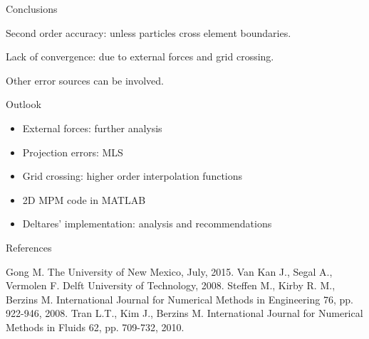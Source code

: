 \documentclass[mathserif,professionalfont,hyperref={pdfpagelabels=false}]{beamer}
\begin{document}
\begin{frame}{Conclusions}
\begin{tcolorbox}[colback=blue!5,colframe=blue!40!black,title=Vibrating bar]
Second order accuracy: unless particles  cross element boundaries.
\end{tcolorbox}
\pause
\begin{tcolorbox}[colback=blue!5,colframe=blue!40!black,title=Oedometer]
Lack of convergence: due to external forces and grid crossing.
\end{tcolorbox}
\pause
\begin{tcolorbox}[colback=blue!5,colframe=blue!40!black,title=Both problems]
Other error sources can be involved.
\end{tcolorbox}
\end{frame}

\begin{frame}{Outlook}
\begin{itemize}
\item External forces: further analysis 
\item Projection errors: MLS
\item Grid crossing: higher order interpolation functions
\item 2D MPM code in MATLAB
\item Deltares' implementation: analysis and recommendations
\end{itemize}
\end{frame}



\begin{frame}{References}
\begin{thebibliography}{22}
  Gong M.
 \newblock The University of New Mexico, July, 2015.
  Van Kan J., Segal A., Vermolen F. 
 \newblock Delft University of Technology, 2008.
  Steffen M., Kirby R. M., Berzins M. 
 \newblock International Journal for Numerical Methods in Engineering 76, pp. 922-946, 2008.
  Tran L.T., Kim J., Berzins M. 
 \newblock International Journal for Numerical Methods in Fluids 62, pp. 709-732, 2010.
\end{thebibliography}
\end{frame}
\end{document}
